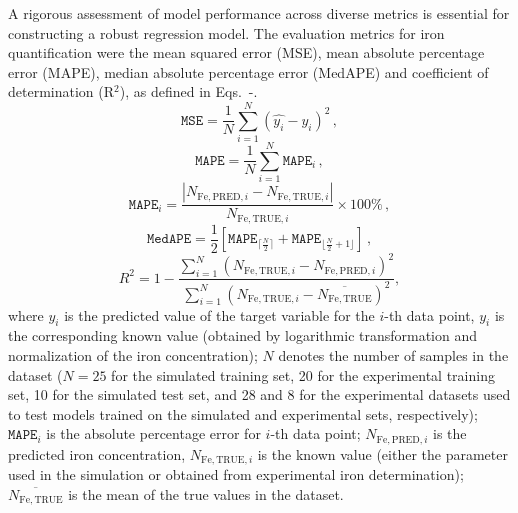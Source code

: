 \documentclass[10pt]{iopart}
\begin{document}
A rigorous assessment of model performance across diverse metrics is essential for constructing a robust regression model.
The evaluation metrics for iron quantification were the mean squared error (MSE),
mean absolute percentage error (MAPE),
median absolute percentage error (MedAPE) and
coefficient of determination (R$^2$), as defined in Eqs.~-.
\begin{equation}\label{eqMSE}
  \mathtt{MSE} = \frac{1}{N}\sum_{i=1}^{N} (\hat{y_i}-y_i)^2\,,
\end{equation}
\begin{equation}\label{eqMAPE}
  \mathtt{MAPE} = \frac{1}{N}\sum_{i=1}^{N} \mathtt{MAPE}_i\,,
\end{equation}
\begin{equation}\label{eqMAPEi}
  \mathtt{MAPE}_i = \frac{|N_{\mathrm{Fe,PRED},i}-N_{\mathrm{Fe,TRUE},i}|}{N_{\mathrm{Fe,TRUE},i}}\times 100 \%\,,
\end{equation}
\begin{equation}\label{eqMedAPE}
  \mathtt{MedAPE} = \frac{1}{2} \left[\mathtt{MAPE}_{\lceil\frac{N}{2}\rceil}+\mathtt{MAPE}_{\lfloor\frac{N}{2}+1\rfloor}\right]\,,
\end{equation}
\begin{equation}\label{eqR2}
  R^2 = 1-\frac{\displaystyle\sum_{i=1}^{N} (N_{\mathrm{Fe,TRUE},i}-N_{\mathrm{Fe,PRED},i})^2}{\displaystyle\sum_{i=1}^{N} (N_{\mathrm{Fe,TRUE},i}-\overline{{N_\mathrm{Fe,TRUE}}})^2},
\end{equation}
where
$\hat{y_i}$ is the predicted value of the target variable for the $i$-th data point,
$y_i$ is the corresponding known value (obtained by logarithmic transformation and normalization of the iron concentration);
$N$ denotes the number of samples in the dataset
($N = 25$ for the simulated training set, 20 for the experimental training set,
10 for the simulated test set,
and 28 and 8 for the experimental datasets used to test models trained on the simulated and experimental sets, respectively);
$\mathtt{MAPE}_i$ is the  absolute percentage error for $i$-th data point;
$N_{\mathrm{Fe,PRED},i}$ is the predicted iron concentration,
$N_{\mathrm{Fe,TRUE},i}$ is the known value
(either the parameter used in the simulation or obtained from experimental iron determination);
$\overline{N_\mathrm{Fe,TRUE}}$ is the mean of the true values in the dataset.
\end{document}
